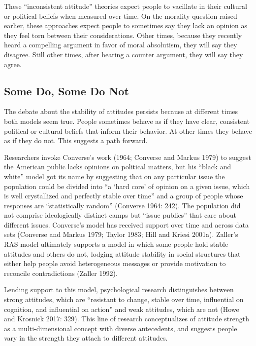 \documentclass[12pt,]{article}
\begin{document}
These ``inconsistent attitude'' theories expect people to vacillate in their cultural or political beliefs when measured over time. On the morality question raised earlier, these approaches expect people to sometimes say they lack an opinion as they feel torn between their considerations. Other times, because they recently heard a compelling argument in favor of moral absolutism, they will say they disagree. Still other times, after hearing a counter argument, they will say they agree.

\hypertarget{some-do-some-do-not}{%
\subsection{Some Do, Some Do Not}\label{some-do-some-do-not}}

The debate about the stability of attitudes persists because at different times both models seem true. People sometimes behave as if they have clear, consistent political or cultural beliefs that inform their behavior. At other times they behave as if they do not. This suggests a path forward.

Researchers invoke Converse's work (1964; Converse and Markus 1979) to suggest the American public lacks opinions on political matters, but his ``black and white'' model got its name by suggesting that on any particular issue the population could be divided into ``a `hard core' of opinion on a given issue, which is well crystallized and perfectly stable over time'' and a group of people whose responses are ``statistically random'' (Converse 1964: 242). The population did not comprise ideologically distinct camps but ``issue publics'' that care about different issues. Converse's model has received support over time and across data sets (Converse and Markus 1979; Taylor 1983; Hill and Kriesi 2001a). Zaller's RAS model ultimately supports a model in which some people hold stable attitudes and others do not, lodging attitude stability in social structures that either help people avoid heterogeneous messages or provide motivation to reconcile contradictions (Zaller 1992).

Lending support to this model, psychological research distinguishes between strong attitudes, which are ``resistant to change, stable over time, influential on cognition, and influential on action'' and weak attitudes, which are not (Howe and Krosnick 2017: 329). This line of research conceptualizes of attitude strength as a multi-dimensional concept with diverse antecedents, and suggests people vary in the strength they attach to different attitudes.
\end{document}

